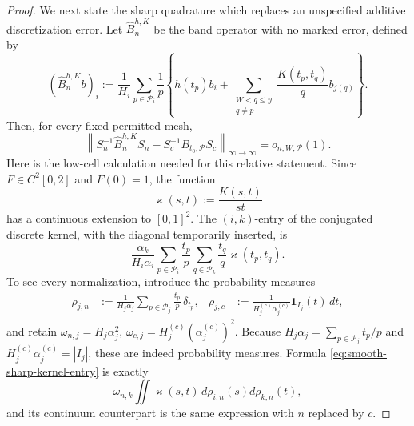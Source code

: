 \documentclass[11pt]{article}
\numberwithin{equation}{section}
\theoremstyle{definition}
\theoremstyle{remark}
\newcommand{\1}{\mathbf 1}
\begin{document}
\begin{proof}
We next state the sharp quadrature which replaces an unspecified
additive discretization error.  Let \(\widehat B_n^{h,K}\) be the band
operator with no marked error, defined by
\begin{equation}
 (\widehat B_n^{h,K}b)_i:=\frac1{H_i}
 \sum_{p\in\mathcal P_i}\frac1p\left\{
     h(t_p)b_i+\sum_{\substack{W<q\le y\\q\ne p}}
          \frac{K(t_p,t_q)}q b_{j(q)}\right\}.
 \label{eq:smooth-discrete-hK-operator}
\end{equation}
Then, for every fixed permitted mesh,
\begin{equation}
 \left\|S_n^{-1}\widehat B_n^{h,K}S_n
       -S_c^{-1}B_{t_0,\mathcal P}S_c
 \right\|_{\infty\to\infty}
       =o_{n;W,\mathcal P}(1).
 \label{eq:smooth-sharp-main-quadrature}
\end{equation}
Here is the low-cell calculation needed for this relative statement.
Since \(F\in C^2[0,2]\) and \(F(0)=1\), the function
\[
 \varkappa(s,t):=\frac{K(s,t)}{st}
\]
has a continuous extension to \([0,1]^2\).  The \((i,k)\)-entry of the
conjugated discrete kernel, with the diagonal temporarily inserted, is
\begin{equation}
 \frac{\alpha_k}{H_i\alpha_i}
 \sum_{p\in\mathcal P_i}\frac{t_p}{p}
 \sum_{q\in\mathcal P_k}\frac{t_q}{q}
       \varkappa(t_p,t_q).
 \label{eq:smooth-sharp-kernel-entry}
\end{equation}
To see every normalization, introduce the probability measures
\begin{align*}
 \rho_{j,n}
 &:=\frac1{H_j\alpha_j}
       \sum_{p\in\mathcal P_j}\frac{t_p}{p}\,\delta_{t_p},&
 \rho_{j,c}
 &:=\frac1{H_j^{(c)}\alpha_j^{(c)}}
       \1_{I_j}(t)\,dt,
\end{align*}
and retain
\(\omega_{n,j}=H_j\alpha_j^2\),
\(\omega_{c,j}=H_j^{(c)}(\alpha_j^{(c)})^2\).
Because \(H_j\alpha_j=\sum_{p\in\mathcal P_j}t_p/p\) and
\(H_j^{(c)}\alpha_j^{(c)}=|I_j|\), these are indeed probability
measures.  Formula \eqref{eq:smooth-sharp-kernel-entry} is exactly
\begin{equation}
 \omega_{n,k}\iint\varkappa(s,t)\,
       d\rho_{i,n}(s)d\rho_{k,n}(t),
 \label{eq:smooth-sharp-kernel-probability-entry}
\end{equation}
and its continuum counterpart is the same expression with \(n\)
replaced by \(c\).


\end{proof}
\end{document}
